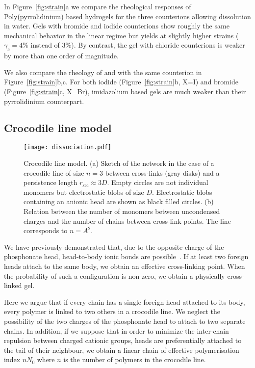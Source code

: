 \documentclass[journal=jacsat,manuscript=article]{achemso}
\begin{document}
In Figure~\ref{fig:strain}a we compare the rheological responses of Poly(pyrrolidinium) based hydrogels for the three counterions allowing dissolution in water. Gels with bromide and iodide counterions show roughly the same mechanical behavior in the linear regime but  yields at slightly higher strains ($\gamma_c=4\%$ instead of $3\%$). By contrast, the gel with chloride counterions is weaker by more than one order of magnitude.

We also compare the rheology of  and  with the same counterion  in Figure~\ref{fig:strain}b,c. For both iodide (Figure~\ref{fig:strain}b, X=I) and bromide (Figure~\ref{fig:strain}c, X=Br), imidazolium based gels are much weaker than their pyrrolidinium counterpart.



\subsection{Crocodile line model}

\begin{figure}
\texttt{[image: dissociation.pdf]}
\caption{Crocodile line model. (a) Sketch of the network in the case of a crocodile line of size $n=3$ between cross-links (gray disks) and a persistence length $r_\mathrm{src}\approx 3D$. Empty circles are not individual monomers but electrostatic blobs of size $D$. Electrostatic blobs containing an anionic head are shown as black filled circles. (b) Relation between the number of monomers between uncondensed charges and the number of chains between cross-link points. The line corresponds to $n = A^2$.}
\label{fig:dissociation}
\end{figure}

We have previously demonstrated that, due to the opposite charge of the phosphonate head, head-to-body ionic bonds are possible~\cite{Srour2014}. If at least two foreign heads attach to the same body, we obtain an effective cross-linking point. When the probability of such a configuration is non-zero, we obtain a physically cross-linked gel.

Here we argue that if every chain has a single foreign head attached to its body, every polymer is linked to two others in a crocodile line. We neglect the possibility of the two charges of the phosphonate head to attach to two separate chains. In addition, if we suppose that in order to minimize the inter-chain repulsion between charged cationic groups, heads are preferentially attached to the tail of their neighbour, we obtain a linear chain of effective polymerisation index $n N_0$ where $n$ is the number of polymers in the crocodile line.
\end{document}
